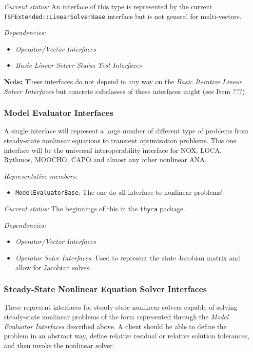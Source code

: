 \documentclass[pdf,ps2pdf,11pt]{SANDreport}
\begin{document}
{}\textit{Current status:} An interface of this type is represented by the
current {}\texttt{TSFExtended\-::Linear\-Solver\-Base} interface but is not
general for multi-vectors.

{}\textit{Dependencies:}
\begin{itemize}
\item {}\textit{Operator/Vector Interfaces}
\item {}\textit{Basic Linear Solver Status Test Interfaces}
\end{itemize}

{}\textbf{Note:} These interfaces do not depend in any way on the
{}\textit{Basic Iterative Linear Solver Interfaces} but concrete subclasses of
these interfaces might (see Item ???).

%
\subsubsection{Model Evaluator Interfaces}
%

A single interface will represent a large number of different type of problems
from steady-state nonlinear equations to transient optimization problems.
This one interface will be the universal interoperability interface for NOX,
LOCA, Rythmos, MOOCHO, CAPO and almost any other nonlinear ANA.

{}\textit{Representative members:}
\begin{itemize}
%
{}\item {}\texttt{ModelEvaluatorBase}: The one do-all interface to nonlinear
problems!
%
\end{itemize}

{}\textit{Current status:} The beginnings of this in the {}\texttt{thyra} package.

{}\textit{Dependencies:}
\begin{itemize}
\item {}\textit{Operator/Vector Interfaces}
\item {}\textit{Operator Solve Interfaces}: Used to represent the state
Jacobian matrix and allow for Jacobian solves.
\end{itemize}

%
\subsubsection{Steady-State Nonlinear Equation Solver Interfaces}
%

These represent interfaces for steady-state nonlinear solvers capable of
solving steady-state nonlinear problems of the form represented through the
{}\textit{Model Evaluator Interfaces} described above.  A client should be
able to define the problem in an abstract way, define relative residual or
relative solution tolerances, and then invoke the nonlinear solver.
\end{document}
